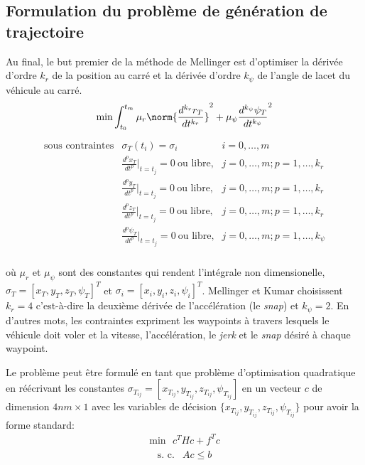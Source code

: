 \subsection{Formulation du problème de génération de trajectoire}

Au final, le but premier de la méthode de Mellinger est d'optimiser la dérivée d'ordre $k_r$ de la position au carré et la dérivée d'ordre $k_\psi$ de l'angle de lacet du véhicule au carré.
\begin{align}\label{eq:opt}
\text{min} \int_{t_0}^{t_m} \mu_r \norm{\frac{d^{k_r} r_T}{dt^{k_r}}}^2 + \mu_\psi \frac{d^{k_\psi} \psi_T}{dt^{k_\psi}}^2
\end{align}\begin{align*}
	\begin{array}{lll}
		\text{sous contraintes} & \sigma_T(t_i) = \sigma_i & i = 0, \ldots, m\\
		& \frac{d^p x_T}{dt^p}|_{t=t_j} = 0\ \text{ou libre,} & j = 0, \ldots, m; p = 1, \ldots, k_r\\
		& \frac{d^p y_T}{dt^p}|_{t=t_j} = 0\ \text{ou libre,} & j = 0, \ldots, m; p = 1, \ldots, k_r\\
		& \frac{d^p z_T}{dt^p}|_{t=t_j} = 0\ \text{ou libre,} & j = 0, \ldots, m; p = 1, \ldots, k_r\\
		& \frac{d^p \psi_T}{dt^p}|_{t=t_j} = 0\ \text{ou libre,} & j = 0, \ldots, m; p = 1, \ldots, k_\psi\\
	\end{array}
\end{align*}

où $\mu_r$ et $\mu_\psi$ sont des constantes qui rendent l'intégrale non dimensionelle, $\sigma_T = [x_T, y_T, z_T, \psi_T]^T$ et $\sigma_i = [x_i, y_i, z_i, \psi_i]^T$. Mellinger et Kumar choisissent $k_r = 4$ c'est-à-dire la deuxième dérivée de l'accélération (le \textit{snap}) et $k_\psi = 2$. En d'autres mots, les contraintes expriment les waypoints à travers lesquels le véhicule doit voler et la vitesse, l'accélération, le \textit{jerk} et le \textit{snap} désiré à chaque waypoint.

Le problème peut être formulé en tant que problème d'optimisation quadratique en réécrivant les constantes $\sigma_{T_{ij}} = [x_{T_{ij}}, y_{T_{ij}}, z_{T_{ij}}, \psi_{T_{ij}}]$ en un vecteur $c$ de dimension $4nm \times 1$ avec les variables de décision $\{x_{T_{ij}}, y_{T_{ij}}, z_{T_{ij}}, \psi_{T_{ij}}\}$ pour avoir la forme standard:
\begin{align}\label{eq:opt_quad}
\text{min}\ \ \ c^THc+f^Tc
\end{align}\begin{align*}
	\begin{array}{ll}
	\text{s. c.} & Ac\leq b
	\end{array}
\end{align*}

